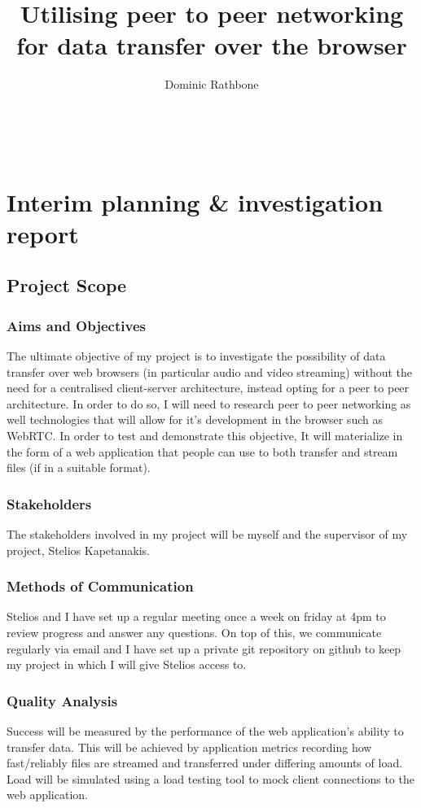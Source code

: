 \documentclass[]{report}
\title{Utilising peer to peer networking for data transfer over the browser}
\author{Dominic Rathbone}
\begin{document}
\maketitle
\tableofcontents
\


\chapter{Interim planning \& investigation report}
	\section{Project Scope}
		\subsection*{Aims and Objectives}
			The ultimate objective of my project is to investigate the possibility of data transfer over web browsers (in particular audio and video streaming) without the need for a centralised client-server architecture, instead opting for a peer to peer architecture. In order to do so, I will need to research peer to peer networking as well technologies that will allow for it's development in the browser such as WebRTC. In order to test and demonstrate this objective, It will materialize in the form of a web application that people can use to both transfer and stream files (if in a suitable format).
		\subsection*{Stakeholders}
			The stakeholders involved in my project will be myself and the supervisor of my project, Stelios Kapetanakis.
		\subsection*{Methods of Communication}
			Stelios and I have set up a regular meeting once a week on friday at 4pm to review progress and answer any questions. On top of this, we communicate regularly via email and I have set up a private git repository on github to keep my project in which I will give Stelios access to.
		\subsection*{Quality Analysis}
			Success will be measured by the performance of the web application's ability to transfer data. This will be achieved by application metrics recording how fast/reliably files are streamed and transferred under differing amounts of load. Load will be simulated using a load testing tool to mock client connections to the web application.
		
\end{document}
